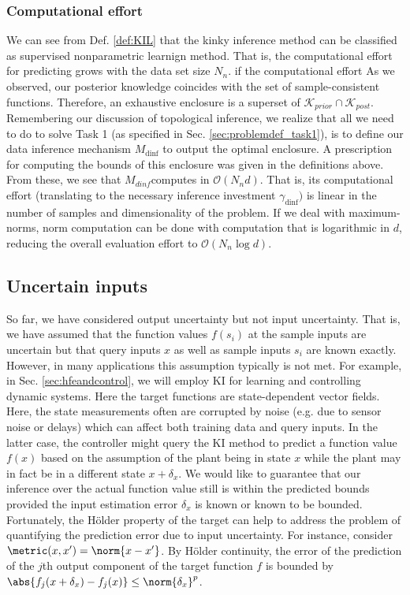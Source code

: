 \subsubsection{Computational effort}
We can see from Def. \ref{def:KIL} that the kinky inference method can be classified as supervised nonparametric learnign method. That is, the computational effort for predicting grows with the data set size $N_n$. if the computational effort 
As we observed, our posterior knowledge coincides with the set of sample-consistent functions. Therefore, an exhaustive enclosure is a superset of $\mathcal K_{prior} \cap \mathcal K_{post}$. 
Remembering our discussion of topological inference, we realize that all we need to do to solve Task 1 (as specified in Sec. \ref{sec:problemdef_task1}), is to define our data inference mechanism $M_{\text{dinf}}$ to output the optimal enclosure. A prescription for computing the bounds of this enclosure was given in the definitions above. From these, we see that $M_{dinf}$computes in $\mathcal O(N_n d)$. That is, its computational effort (translating to the necessary inference investment $\gamma_{\text{dinf}})$ is linear in the number of samples and dimensionality of the problem. If we deal with maximum-norms, norm computation can be done with computation that is logarithmic in $d$, reducing the overall evaluation effort to $\mathcal O(N_n \log d)$.   


\subsection{Uncertain inputs}
So far, we have considered output uncertainty but not input uncertainty. That is, we have assumed that the function values $f(s_i)$ at the sample inputs are uncertain but that query inputs $x$ as well as sample 
inputs $s_i$ are known exactly. However, in many applications this assumption typically is not met. For example, in Sec. \ref{sec:hfeandcontrol}, we will employ KI for learning and controlling dynamic systems.
Here the target functions are state-dependent vector fields. Here, the state measurements often are corrupted by noise (e.g. due to sensor noise or delays) which can affect both training data and query inputs. In the latter case, the controller might query the KI method to predict 
a function value $f(x)$ based on the assumption of the plant being in state $x$ while the plant may in fact be in a different state $x+\delta_x$. We would like to guarantee that our inference over the actual function value still is within the predicted bounds provided the input estimation error $\delta_x$ is known or known to be bounded. 
Fortunately, the H\"older property of the target can help to address the problem of quantifying the prediction error due to input uncertainty. For instance, consider $\metric(x,x') = \norm{x-x'}$. By H\"older continuity, the error of the prediction of the $j$th output component of the target function $f$ is bounded by $\abs{f_j(x+\delta_x) - f_j(x)} \leq \norm{\delta_x}^p$. 

